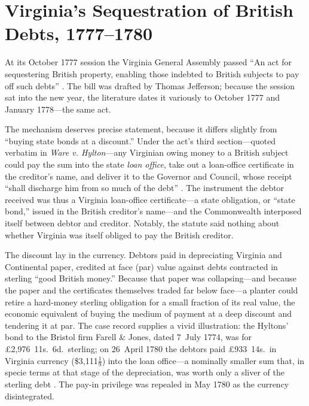 \documentclass[12pt]{article}
\begin{document}
\section{Virginia's Sequestration of British Debts, 1777--1780}
\label{sec:virginia}

At its October 1777 session the Virginia General Assembly passed ``An act for
sequestering British property, enabling those indebted to British subjects to pay
off such debts'' \citep[9:377--380]{hening1777sequestration}. The bill was drafted
by Thomas Jefferson; because the session sat into the new year, the literature
dates it variously to October 1777 and January 1778---the same act.

The mechanism deserves precise statement, because it differs slightly from
``buying state bonds at a discount.'' Under the act's third section---quoted
verbatim in \emph{Ware v. Hylton}---any Virginian owing money to a British subject
could pay the sum into the state \emph{loan office}, take out a loan-office
certificate in the creditor's name, and deliver it to the Governor and Council,
whose receipt ``shall discharge him from so much of the debt''
\citep{warevhylton1796, hening1777sequestration}. The instrument the debtor
received was thus a Virginia loan-office certificate---a state obligation, or
``state bond,'' issued in the British creditor's name---and the Commonwealth
interposed itself between debtor and creditor. Notably, the statute said nothing
about whether Virginia was itself obliged to pay the British creditor.

The discount lay in the currency. Debtors paid in depreciating Virginia and
Continental paper, credited at face (par) value against debts contracted in
sterling ``good British money.'' Because that paper was collapsing---and because
the paper and the certificates themselves traded far below face---a planter could
retire a hard-money sterling obligation for a small fraction of its real value,
the economic equivalent of buying the medium of payment at a deep discount and
tendering it at par. The case record supplies a vivid illustration: the Hyltons'
bond to the Bristol firm Farell \& Jones, dated 7~July 1774, was for
\pounds2{,}976~11s.~6d.\ sterling; on 26~April 1780 the debtors paid
\pounds933~14s.\ in Virginia currency (\$3{,}111\ensuremath{\tfrac{1}{9}}) into the loan
office---a nominally smaller sum that, in specie terms at that stage of the
depreciation, was worth only a sliver of the sterling debt
\citep{warevhylton1796}. The pay-in privilege was repealed in May 1780 as the
currency disintegrated.
\end{document}
